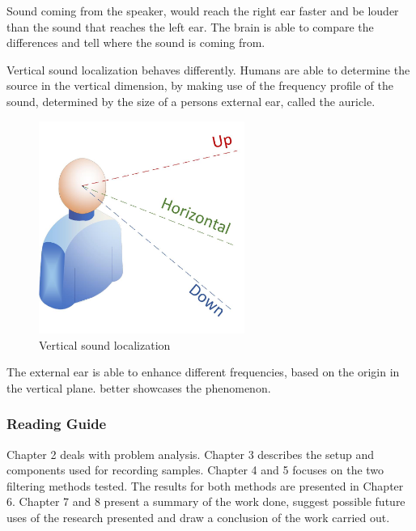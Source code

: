 Sound coming from the speaker, would reach  the right ear faster and be louder than 
the sound that reaches the left ear. The brain is able to compare the differences
and tell where the sound is coming from.

Vertical sound localization behaves differently. Humans are able to determine the source
in the vertical dimension, by making use of the frequency profile of the sound, determined
by the size of a persons external ear, called the auricle.

\begin{figure}[htp]
	\centering
	\includegraphics[width = 0.6\textwidth]{Illustrations/verticalSoundLocalization.jpg}
	\caption{Vertical sound localization}
	\label{fig:verticalSoundLocalization}
\end{figure}

The external ear is able to enhance different frequencies, based on the origin in the vertical
plane.  better showcases the phenomenon. 


\subsubsection{Reading Guide}
Chapter 2 deals with problem analysis. Chapter 3 describes the setup and components
used for recording samples. Chapter 4 and 5 focuses on the two filtering methods
tested. The results for both methods are presented in Chapter 6. Chapter 7 and 
8 present a summary of the work done, suggest possible future uses of the research 
presented and draw a conclusion of the work carried out.
